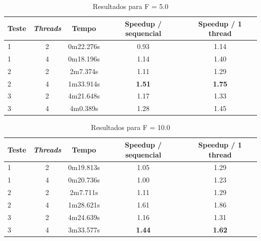 \documentclass[12pt]{article}
\begin{document}
\begin{table}[H]
  \begin{center}
    \begin{tabular}{ | l | c | c | c | c |}
      \hline
      \textbf{Teste} & \textbf{\textit{Threads}} & \textbf{Tempo} & \textbf{Speedup / sequencial} & \textbf{Speedup / 1 thread}\\ \hline
      1 & 2 & 0m22.276s & 0.93 & 1.14 \\ \hline
      1 & 4 & 0m18.196s & 1.14 & 1.40 \\ \hline
      2 & 2 & 2m7.374s & 1.11 & 1.29 \\ \hline
      2 & 4 & 1m33.914s & \textbf{1.51} & \textbf{1.75} \\ \hline
      3 & 2 & 4m21.648s & 1.17 & 1.33 \\ \hline
      3 & 4 & 4m0.389s & 1.28 & 1.45 \\ \hline
  \end{tabular}
  \caption{Resultados para F = 5.0}
  \label{tbl:resultados5}
  \end{center}
\end{table}

\begin{table}[H]
  \begin{center}
    \begin{tabular}{ | l | c | c | c | c |}
      \hline
      \textbf{Teste} & \textbf{\textit{Threads}} & \textbf{Tempo} & \textbf{Speedup / sequencial} & \textbf{Speedup / 1 thread}\\ \hline
      1 & 2 & 0m19.813s & 1.05 & 1.29 \\ \hline
      1 & 4 & 0m20.736s & 1.00 & 1.23 \\ \hline
      2 & 2 & 2m7.711s & 1.11 & 1.29 \\ \hline
      2 & 4 & 1m28.621s & 1.61 & 1.86 \\ \hline
      3 & 2 & 4m24.639s & 1.16 & 1.31 \\ \hline
      3 & 4 & 3m33.577s & \textbf{1.44} & \textbf{1.62} \\ \hline
  \end{tabular}
  \caption{Resultados para F = 10.0}
  \label{tbl:resultados10}
  \end{center}
\end{table}
\end{document}
